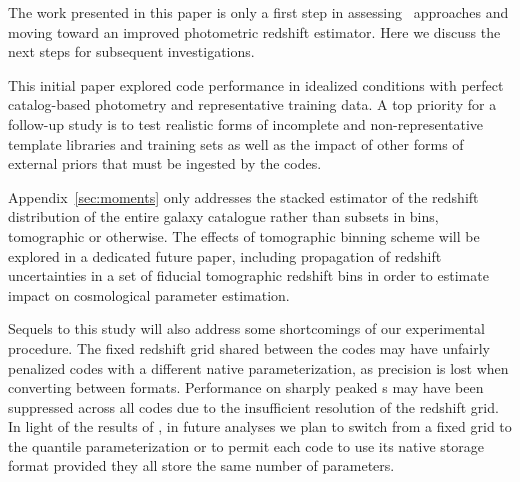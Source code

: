 
The work presented in this paper is only a first step in assessing \pzpdf\ approaches and moving toward an improved photometric redshift estimator.
Here we discuss the next steps for subsequent investigations.

This initial paper explored code performance in idealized conditions with perfect catalog-based photometry and representative training data.
A top priority for a follow-up study is to test realistic forms of incomplete and non-representative template libraries and training sets as well as the impact of other forms of external priors that must be ingested by the codes.

Appendix~\ref{sec:moments} only addresses the stacked estimator of the redshift distribution of the entire galaxy catalogue rather than subsets in bins, tomographic or otherwise.
The effects of tomographic binning scheme will be explored in a dedicated future paper, including propagation of redshift uncertainties in a set of fiducial tomographic redshift bins in order to estimate impact on cosmological parameter estimation.


Sequels to this study will also address some shortcomings of our experimental procedure.
The fixed redshift grid shared between the codes may have unfairly penalized codes with a different native parameterization, as precision is lost when converting between formats.
Performance on sharply peaked \pzpdf s may have been suppressed across all codes due to the insufficient resolution of the redshift grid.
In light of the results of \citet[]{Malz:qp}, in future analyses we plan to switch from a fixed grid to the quantile parameterization or to permit each code to use its native storage format provided they all store the same number of parameters.

